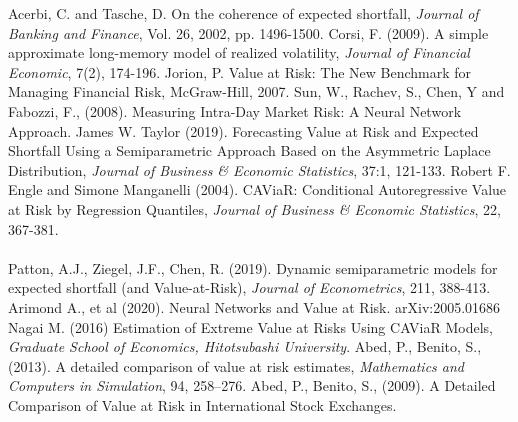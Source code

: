 \documentclass[a4paper,11pt,oneside]{book}
\begin{document}



Acerbi, C. and Tasche, D. On the coherence of expected shortfall, \textit{Journal of Banking and Finance}, Vol. 26, 2002,
pp. 1496-1500.\newline\newline
Corsi, F. (2009). A simple approximate long-memory model of realized volatility, \textit{Journal of
Financial Economic}, 7(2), 174-196.\newline\newline 
Jorion, P.   Value at Risk: The New Benchmark for Managing Financial Risk, McGraw-Hill, 2007.\newline\newline
Sun, W., Rachev, S., Chen, Y and Fabozzi, F., (2008). Measuring Intra-Day Market
Risk: A Neural Network Approach.\newline\newline
James W. Taylor (2019). Forecasting Value at Risk and Expected Shortfall
Using a Semiparametric Approach Based on the Asymmetric Laplace Distribution, \textit{Journal of
Business \& Economic Statistics}, 37:1, 121-133.\newline\newline
Robert F. Engle and Simone Manganelli (2004). CAViaR: Conditional Autoregressive Value at Risk by Regression Quantiles, \textit{Journal of Business \& Economic Statistics}, 22, 367-381.\\\\
Patton, A.J., Ziegel, J.F., Chen, R. (2019). Dynamic semiparametric models for expected shortfall
(and Value-at-Risk), \textit{Journal of Econometrics}, 211, 388-413.\newline\newline
Arimond A., et al (2020). Neural Networks and Value at Risk. 	arXiv:2005.01686\newline\newline
Nagai M. (2016) Estimation of Extreme Value at Risks Using CAViaR Models, \textit{Graduate School of Economics, Hitotsubashi University}.\newline\newline
Abed, P., Benito, S., (2013). A detailed comparison of value at risk estimates, \textit{Mathematics and Computers in Simulation}, 94, 258–276.\newline\newline
Abed, P., Benito, S., (2009). A Detailed Comparison of Value at Risk in International Stock Exchanges.\newline\newline
\end{document}
